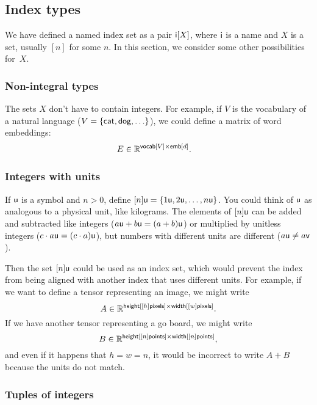 \subsection{Index types}

We have defined a named index set as a pair $\mathsf{i}[X]$, where $\mathsf{i}$ is a name and $X$ is a set, usually $[n]$ for some $n$. In this section, we consider some other possibilities for~$X$.

\subsubsection{Non-integral types}

The sets $X$ don't have to contain integers. For example, if $V$ is the vocabulary of a natural language ($V = \{ \mathsf{cat}, \mathsf{dog}, \ldots \}$), we could define a matrix of word embeddings:
\begin{align*}
  E &\in \mathbb{R}^{\mathsf{vocab}[V] \times \mathsf{emb}[d]}.
\end{align*}

\subsubsection{Integers with units}

If $\mathsf{u}$ is a symbol and $n > 0$, define $[n]\mathsf{u} = \{1\mathsf{u}, 2\mathsf{u}, \ldots, n\mathsf{u}\}$. You could think of $\mathsf{u}$ as analogous to a physical unit, like kilograms. The elements of $[n]\mathsf{u}$ can be added and subtracted like integers ($a\mathsf{u} + b\mathsf{u} = (a+b)\mathsf{u}$) or multiplied by unitless integers ($c \cdot a\mathsf{u} = (c \cdot a) \mathsf{u}$), but numbers with different units are different ($a \mathsf{u} \neq a \mathsf{v}$).

Then the set $[n]\mathsf{u}$ could be used as an index set, which would prevent the index from being aligned with another index that uses different units. For example, if we want to define a tensor representing an image, we might write
\[ A \in \mathbb{R}^{\mathsf{height}[[h]\mathsf{pixels}] \times \mathsf{width}[[w]\mathsf{pixels}]}. \]
If we have another tensor representing a go board, we might write
\[ B \in \mathbb{R}^{\mathsf{height}[[n]\mathsf{points}] \times \mathsf{width}[[n]\mathsf{points}]}, \]
and even if it happens that $h = w = n$, it would be incorrect to write $A+B$ because the units do not match.

\subsubsection{Tuples of integers}

